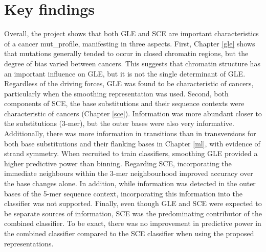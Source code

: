 \section{Key findings}
\label{intro:findings}
Overall, the project shows that both GLE and SCE are important characteristics of a cancer \gls{mut_profile}, manifesting in three aspects. First, Chapter \ref{gle} shows that mutations generally tended to occur in closed chromatin regions, but the degree of bias varied between cancers. This suggests that chromatin structure has an important influence on GLE, but it is not the single determinant of GLE. Regardless of the driving forces, GLE was found to be characteristic of cancers, particularly when the smoothing representation was used. Second, both components of SCE, the base substitutions and their sequence contexts were characteristic of cancers (Chapter \ref{sce}). Information was more abundant closer to the substitutions (3-mer), but the outer bases were also very informative. Additionally, there was more information in \glspl{transition} than in \glspl{transversion} for both base substitutions and their flanking bases in Chapter \ref{ml}, with evidence of strand symmetry. When recruited to train classifiers, smoothing GLE provided a higher predictive power than binning. Regarding SCE, incorporating the immediate neighbours within the 3-mer neighbourhood improved accuracy over the base changes alone. In addition, while information was detected in the outer bases of the 5-mer sequence context, incorporating this information into the classifier was not supported. Finally, even though GLE and SCE were expected to be separate sources of information, SCE was the predominating contributor of the combined classifier. To be exact, there was no improvement in predictive power in the combined classifier compared to the SCE classifier when using the proposed representations.
